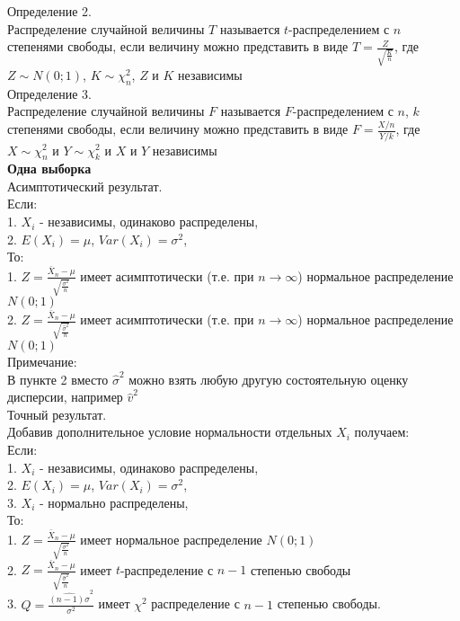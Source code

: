 \documentclass[pdftex,12pt,a4paper]{article}
\begin{document}
Определение 2. \\
Распределение случайной величины $T$ называется $t$-распределением
с $n$ степенями свободы, если величину можно представить в виде
$T=\frac{Z}{\sqrt{\frac{K}{n}}}$, где $Z \sim N(0;1)$, $K\sim
\chi_{n}^{2}$, $Z$ и $K$ независимы \\

Определение 3. \\
Распределение случайной величины $F$ называется $F$-распределением
с $n$, $k$ степенями свободы, если величину можно представить в
виде $F=\frac{X/n}{Y/k}$, где $X\sim \chi_{n}^{2}$ и $Y\sim
\chi_{k}^{2}$ и $X$ и $Y$ независимы \\

\textbf{Одна выборка} \\

Асимптотический результат. \\
Если: \\
1. $X_{i}$ - независимы, одинаково распределены, \\
2. $E(X_{i})=\mu$, $Var(X_{i})=\sigma^{2}$, \\
То: \\
1. $Z=\frac{\bar{X}_{n}-\mu}{\sqrt{\frac{\sigma^{2}}{n}}}$ имеет
асимптотически  (т.е. при $n\to\infty$) нормальное распределение $N(0;1)$ \\
2. $Z=\frac{\bar{X}_{n}-\mu}{\sqrt{\frac{\hat{\sigma}^{2}}{n}}}$
имеет
асимптотически  (т.е. при $n\to\infty$) нормальное распределение $N(0;1)$ \\
Примечание: \\
В пункте 2 вместо $\hat{\sigma}^{2}$ можно взять любую другую
состоятельную оценку дисперсии, например $\hat{v}^{2}$ \\

Точный результат. \\
Добавив дополнительное условие нормальности отдельных $X_{i}$
получаем: \\
Если: \\
1. $X_{i}$ - независимы, одинаково распределены, \\
2. $E(X_{i})=\mu$, $Var(X_{i})=\sigma^{2}$, \\
3. $X_{i}$ - нормально распределены, \\
То: \\
1. $Z=\frac{\bar{X}_{n}-\mu}{\sqrt{\frac{\sigma^{2}}{n}}}$ имеет
 нормальное распределение $N(0;1)$ \\
2. $Z=\frac{\bar{X}_{n}-\mu}{\sqrt{\frac{\hat{\sigma}^{2}}{n}}}$
имеет
 $t$-распределение с $n-1$ степенью свободы \\
3. $Q=\frac{\hat{(n-1)\sigma}^{2}}{\sigma^{2}}$ имеет $\chi^{2}$
распределение с $n-1$ степенью свободы. \\
\end{document}
